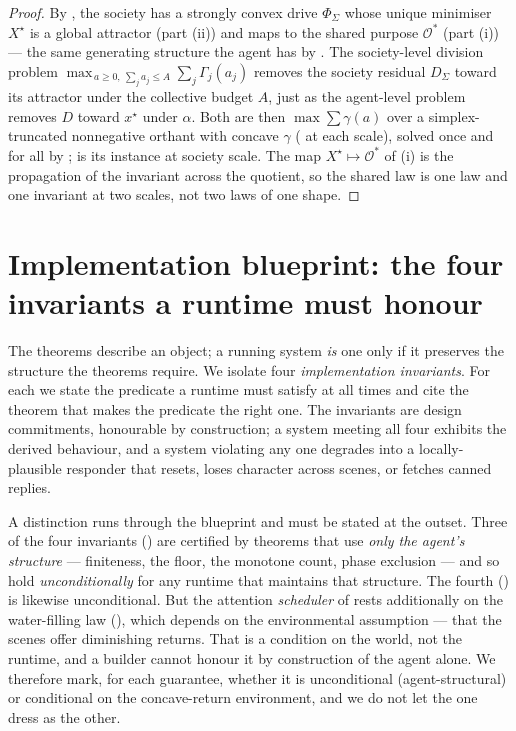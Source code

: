 \documentclass[11pt,twocolumn,a4paper]{article}
\newcommand{\drive}{\Phi}            %
\newcommand{\Purp}{x^{\star}}        %
\newcommand{\att}{\alpha}            %
\newcommand{\Soc}{\Sigma}            %
\newcommand{\Out}{\mathcal{O}}       %
\begin{document}
\begin{proof}
By , the society has a strongly convex drive
$\drive_\Soc$ whose unique minimiser $X^\star$ is a global attractor
(part (ii)) and maps to the shared purpose $\Out^\ast$ (part (i)) --- the
same generating structure the agent has by . The
society-level division problem
$\max_{\,a\ge0,\ \sum_j a_j\le A}\sum_j\Gamma_j(a_j)$ removes the society
residual $D_\Soc$ toward its attractor under the collective budget $A$,
just as the agent-level problem removes $D$ toward $\Purp$ under $\att$.
Both are then $\max\sum\gamma(a)$ over a simplex-truncated nonnegative
orthant with concave $\gamma$ ( at each scale), solved once
and for all by ;  is its instance
at society scale. The map $X^\star\mapsto\Out^\ast$ of
(i) is the propagation of the invariant across
the quotient, so the shared law is one law and one invariant at two scales,
not two laws of one shape.
\end{proof}

\section{Implementation blueprint: the four invariants a runtime must
honour}
\label{sec:blueprint}

The theorems describe an object; a running system \emph{is} one only if it
preserves the structure the theorems require. We isolate four
\emph{implementation invariants}. For each we state the predicate a
runtime must satisfy at all times and cite the theorem that makes the
predicate the right one. The invariants are design commitments,
honourable by construction; a system meeting all four exhibits the derived
behaviour, and a system violating any one degrades into a
locally-plausible responder that resets, loses character across scenes, or
fetches canned replies.

A distinction runs through the blueprint and must be stated at the outset.
Three of the four invariants () are
certified by theorems that use \emph{only the agent's structure} ---
finiteness, the floor, the monotone count, phase exclusion --- and so hold
\emph{unconditionally} for any runtime that maintains that structure. The
fourth () is likewise unconditional. But the attention
\emph{scheduler} of  rests additionally on the
water-filling law (), which depends on the environmental
assumption  --- that the scenes offer diminishing returns.
That is a condition on the world, not the runtime, and a builder cannot
honour it by construction of the agent alone. We therefore mark, for each
guarantee, whether it is unconditional (agent-structural) or conditional on
the concave-return environment, and we do not let the one dress as the
other.
\end{document}
